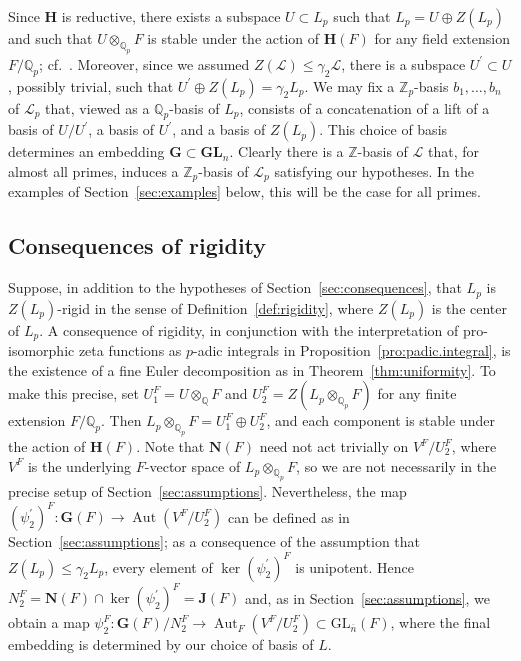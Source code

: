 \documentclass[11pt,a4paper]{amsart}
\theoremstyle{plain}
\theoremstyle{remark}
\newcommand{\Z}{\mathbb{Z}}
\newcommand{\Q}{\mathbb{Q}}
\newcommand{\tensor}{\otimes}
\newcommand{\dimL}{n}
\newcommand{\overdim}{\overline{n}}
\DeclareMathOperator{\Aut}{Aut}
\begin{document}
Since $\mathbf{H}$ is reductive, there exists a subspace $U \subset L_p$ such that $L_p = U \oplus Z(L_p)$ and such that $U \tensor_{\Q_p} F$ is stable under the action of $\mathbf{H}(F)$ for any field extension $F/\Q_p$; cf.~\cite[Theorem~22.138]{Milne/17}.  Moreover, since we assumed $Z(\mathcal{L}) \leq \gamma_2 \mathcal{L}$, there is a subspace $U^\prime \subset U$, possibly trivial, such that $U^\prime \oplus Z(L_p) = \gamma_2 L_p$.  
We may fix a $\Z_p$-basis $b_1, \dots, b_\dimL$ of $\mathcal{L}_p$ that, viewed as a $\Q_p$-basis of $L_p$, consists of a concatenation of a lift of a basis of $U/U^\prime$, a basis of $U^\prime$, and a basis of $Z(L_p)$.  This choice of basis determines an embedding $\mathbf{G} \subset \mathbf{GL}_\dimL$.  Clearly there is a $\Z$-basis of $\mathcal{L}$ that, for almost all primes, induces a $\Z_p$-basis of $\mathcal{L}_p$ satisfying our hypotheses.  In the examples of Section~\ref{sec:examples} below, this will be the case for all primes.

\subsection{Consequences of rigidity}
Suppose, in addition to the hypotheses of Section~\ref{sec:consequences}, that $L_p$ is $Z(L_p)$-rigid in the sense of Definition~\ref{def:rigidity}, where $Z(L_p)$ is the center of $L_p$.  A consequence of rigidity, in conjunction with the interpretation of pro-isomorphic zeta functions as $p$-adic integrals in Proposition~\ref{pro:padic.integral}, is the existence of a fine Euler decomposition as in Theorem~\ref{thm:uniformity}.
To make this precise, set $U_1^F = U \tensor_{\Q} F$ and $U_2^F = Z(L_p \tensor_{\Q_p} F)$ for any finite extension $F/\Q_p$.  Then $L_p \tensor_{\Q_p} F = U_1^F \oplus U_2^F$, and each component is stable under the action of $\mathbf{H}(F)$.  Note that $\mathbf{N}(F)$ need not act trivially on $V^F / U_2^F$, where $V^F$ is the underlying $F$-vector space of $L_p \tensor_{\Q_p} F$, so we are not necessarily in the precise setup of Section~\ref{sec:assumptions}.  Nevertheless, the map $(\psi^\prime_2)^F : \mathbf{G}(F) \to \Aut (V^F/U_2^F)$ can be defined as in Section~\ref{sec:assumptions}; as a consequence of the assumption that $Z(L_p) \leq \gamma_2 L_p$, every element of $\ker (\psi^\prime_2)^F$ is unipotent.  Hence $N_2^F = \mathbf{N}(F) \cap \ker (\psi^\prime_2)^F = \mathbf{J}(F)$ and, as in Section~\ref{sec:assumptions}, we obtain a map $\psi_2^F : \mathbf{G}(F)/N_2^F \to \Aut_F (V^F/U_2^F) \subset \mathrm{GL}_{\overdim} (F)$, where the final embedding is determined by our choice of basis of $L$.
\end{document}
